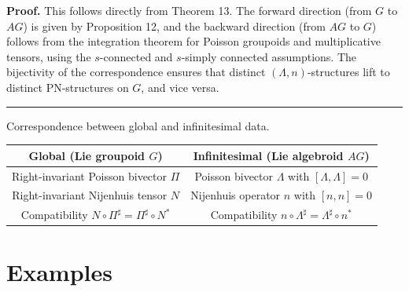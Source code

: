 \documentclass{article}
\newenvironment{proof}[1][Proof]{\noindent\textbf{#1.} }{\ \rule{0.5em}{0.5em}}
\begin{document}
\begin{proof}
This follows directly from Theorem 13. The forward direction (from $G$ to $AG$) is given by Proposition 12, and the backward direction (from $AG$ to $G$) follows from the integration theorem for Poisson groupoids and multiplicative tensors, using the $s$-connected and $s$-simply connected assumptions. The bijectivity of the correspondence ensures that distinct $(\Lambda, n)$-structures lift to distinct PN-structures on $G$, and vice versa.
\end{proof}


\begin{center}{Correspondence between global and infinitesimal data.}
\begin{tabular}{|c|c|}
\hline
\textbf{Global (Lie groupoid $G$)} & \textbf{Infinitesimal (Lie algebroid $AG$)} \\
\hline
Right-invariant Poisson bivector $\Pi$ & Poisson bivector $\Lambda$ with $[\Lambda,\Lambda]=0$ \\
\hline
Right-invariant Nijenhuis tensor $N$ & Nijenhuis operator $n$ with $[n,n]=0$ \\
\hline
Compatibility $N \circ \Pi^\sharp = \Pi^\sharp \circ N^*$ & Compatibility $n \circ \Lambda^\sharp = \Lambda^\sharp \circ n^*$ \\
\hline
\end{tabular}
\end{center}


\section{Examples}
\end{document}
